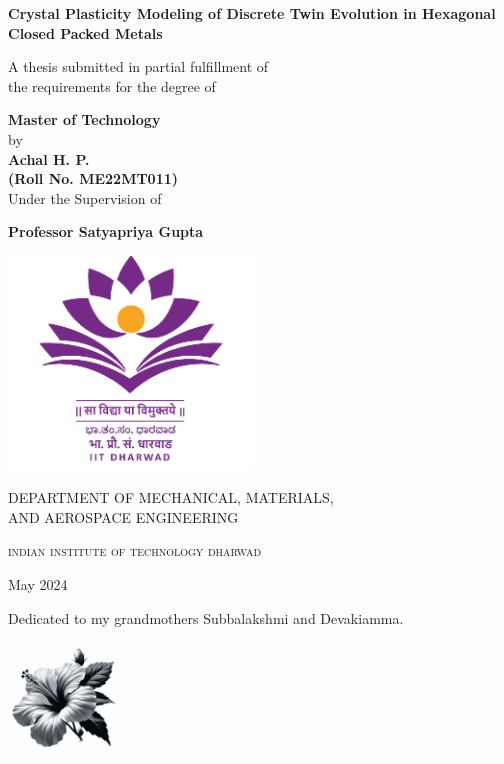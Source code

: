 \documentclass{report}
\begin{document}
\begin{titlepage}
    \centering
    {\huge\bfseries Crystal Plasticity Modeling of Discrete Twin Evolution in Hexagonal Closed Packed Metals\par}
    \vspace{2cm}
    {\large A thesis submitted in partial fulfillment of \\  the requirements for the degree of \par}
    \vspace{0.5cm}
    {\large \bf Master of Technology}\\
    \vspace{0.5cm}
    {\large by }\\
    \vspace{1cm}
    {\large \bf Achal H. P.} \\
    {\large \bf (Roll No. ME22MT011)} \\
    \vspace{1.5cm}
    {\large Under the Supervision of} \\
    {\large \bf Professor Satyapriya Gupta \par}
    \vfill
    \includegraphics[width=6.5cm]{images/IIT Dh Logo.png}\\[\baselineskip]
    \vfill
    {\large \uppercase{Department of Mechanical, Materials, \\ and Aerospace Engineering}\par}
    \vspace{0.25cm}
    {\scshape\LARGE indian institute of technology dharwad\par}
    \vspace{0.5cm}
    {\large May 2024}
\end{titlepage}


\newpage
\cleardoublepage
\thispagestyle{empty}
\begin{center}
    {Dedicated to my grandmothers Subbalakshmi and Devakiamma.\par}
    \vspace{1cm}
    \includegraphics[width=3cm]{images/Hibiscus.png}
\end{center}
\end{document}
